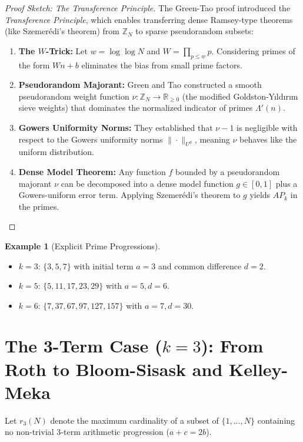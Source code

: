 \documentclass[11pt,a4paper]{article}
\theoremstyle{definition}
\newtheorem{example}[theorem]{Example}
\begin{document}
\begin{proof}[Proof Sketch: The Transference Principle]
The Green-Tao proof introduced the \emph{Transference Principle}, which enables transferring dense Ramsey-type theorems (like Szemer\'edi's theorem) from $\mathbb{Z}_N$ to sparse pseudorandom subsets:
\begin{enumerate}
    \item \textbf{The $W$-Trick:} Let $w = \log \log N$ and $W = \prod_{p \le w} p$. Considering primes of the form $W n + b$ eliminates the bias from small prime factors.
    \item \textbf{Pseudorandom Majorant:} Green and Tao constructed a smooth pseudorandom weight function $\nu : \mathbb{Z}_N \to \mathbb{R}_{\ge 0}$ (the modified Goldston-Y{\i}ld{\i}r{\i}m sieve weights) that dominates the normalized indicator of primes $\Lambda'(n)$.
    \item \textbf{Gowers Uniformity Norms:} They established that $\nu - 1$ is negligible with respect to the Gowers uniformity norms $\| \cdot \|_{U^d}$, meaning $\nu$ behaves like the uniform distribution.
    \item \textbf{Dense Model Theorem:} Any function $f$ bounded by a pseudorandom majorant $\nu$ can be decomposed into a dense model function $g \in [0, 1]$ plus a Gowers-uniform error term.
    Applying Szemer\'edi's theorem to $g$ yields $AP_k$ in the primes.
\end{enumerate}
\end{proof}

\begin{example}[Explicit Prime Progressions]\label{ex:prime_aps}
\begin{itemize}
    \item $k = 3$: $\{3, 5, 7\}$ with initial term $a = 3$ and common difference $d = 2$.
    \item $k = 5$: $\{5, 11, 17, 23, 29\}$ with $a = 5, d = 6$.
    \item $k = 6$: $\{7, 37, 67, 97, 127, 157\}$ with $a = 7, d = 30$.
\end{itemize}
\end{example}

\section{The 3-Term Case ($k=3$): From Roth to Bloom-Sisask and Kelley-Meka}

Let $r_3(N)$ denote the maximum cardinality of a subset of $\{1, \dots, N\}$ containing no non-trivial 3-term arithmetic progression ($a + c = 2b$).
\end{document}
